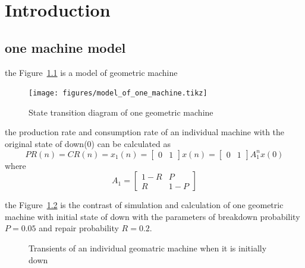 \chapter{Introduction}
\setlength{\parindent}{2pc}
\section{one machine model}
\noindent the Figure~\ref{State transition diagram of one geometric machine} is a model of geometric machine

\begin{figure}[!h]
	\centering
	\texttt{[image: figures/model\_of\_one\_machine.tikz]}
	\caption{State transition diagram of one geometric machine}
	\label{State transition diagram of one geometric machine}
\end{figure}

the production rate and consumption rate of an individual machine with the original state of down(0) can be calculated as 
\begin{displaymath} PR(n)=CR(n)=x_1(n)=\begin{bmatrix} 0&1 \end{bmatrix}x(n)=\begin{bmatrix} 0&1 \end{bmatrix}A_1^n
x(0) \end{displaymath}
where
\begin{displaymath} A_1 = \begin{bmatrix} 1-R&P\\R&1-P \end{bmatrix} \end{displaymath}

the Figure~\ref{Transients of an individual geomatric machine when it is initially down} is the contrast of simulation and calculation of one geometric machine with initial state of down with the parameters of breakdown
probability $P = 0.05$ and repair probability $R = 0.2$.

\begin{figure}[!h]
	\centering
	\caption{Transients of an individual geomatric machine when it is initially down}
	\label{Transients of an individual geomatric machine when it is initially down}
\end{figure}

